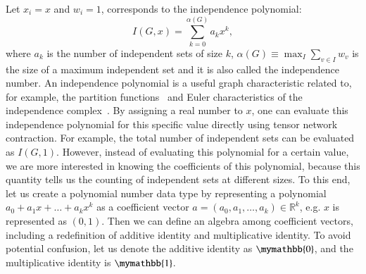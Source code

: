 \documentclass[review, onefignum, onetabnum]{siamart190516}
\begin{document}
Let $x_i = x$ and $w_i = 1$,  corresponds to the independence polynomial:
\begin{equation}\label{eq:idpdef}
I(G, x) = \sum_{k=0}^{\alpha(G)} a_k x^k,
\end{equation}
where $a_k$ is the number of independent sets of size $k$, $\alpha(G) \equiv \max_{I}\sum_{v\in I}w_v$ is the size of a maximum independent set and it is also called the independence number.
An independence polynomial is a useful graph characteristic related to, for example, the partition functions~\cite{Lee1952,Yang1952} and Euler characteristics of the independence complex~\cite{Bousquet2008, Levit2009}.
By assigning a real number to $x$, one can evaluate this independence polynomial for this specific value directly using tensor network contraction.
For example, the total number of independent sets can be evaluated as $I(G, 1)$.
However, instead of evaluating this polynomial for a certain value, we are more interested in knowing the coefficients of this polynomial, because this quantity tells us the counting of independent sets at different sizes.
To this end, let us create a polynomial number data type by representing a polynomial $a_0 + a_1 x + \ldots + a_k x^k$ as a coefficient vector $a = (a_0, a_1, \ldots, a_k) \in \mathbb{R}^k$, e.g. $x$ is represented as $(0, 1)$.
Then we can define an algebra among coefficient vectors, including a redefinition of additive identity and multiplicative identity.
To avoid potential confusion, let us denote the additive identity as $\mymathbb{0}$, and the multiplicative identity is $\mymathbb{1}$.
\end{document}
